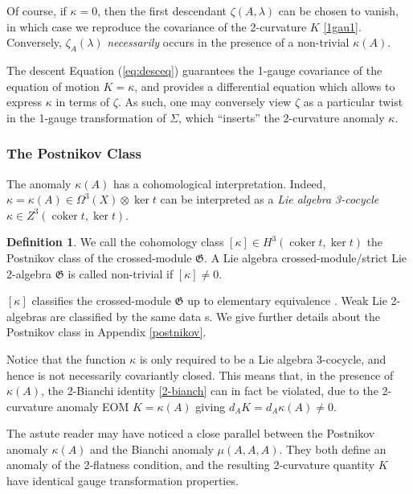 \documentclass[onecolumn]{article}
\theoremstyle{theorem}
\theoremstyle{remark}
\theoremstyle{example}
\theoremstyle{definition}
\newtheorem{definition}{Definition}[section]
\numberwithin{equation}{section}
\begin{document}
{Of course, } %
if $\kappa=0$, then the first descendant $\zeta(A,\lambda)$ can be chosen to vanish, in which case we reproduce the covariance of the 2-curvature $K$ \eqref{1gau1}. Conversely, $\zeta_A(\lambda)$ \textit{{necessarily}} occurs in the presence of a non-trivial $\kappa(A)$. 

The {descent Equation}  (\ref{eq:desceq}) guarantees the 1-gauge covariance of the equation of motion $K=\kappa$, and provides a differential equation which allows to express $\kappa$ in terms of $\zeta$. As such, one may conversely view $\zeta$ as a particular twist in the 1-gauge transformation of $\Sigma$, which ``inserts'' the 2-curvature anomaly $\kappa$. 

\subsubsection{The Postnikov Class}
The anomaly $\kappa(A)$ has a cohomological interpretation. Indeed, $\kappa=\kappa(A)\in \Omega^3(X)\otimes\operatorname{ker}t$ can be interpreted as a  {\it {Lie algebra 3-cocycle}} $\kappa\in Z^3(\operatorname{coker}t,\operatorname{ker}t)$.

\begin{definition}
We call the cohomology class $[\kappa]\in H^3(\operatorname{coker}t,\operatorname{ker}t)$ the { {Postnikov class}} of the crossed-module $\mathfrak{G}$. A Lie algebra crossed-module/strict Lie 2-algebra $\mathfrak{G}$ is called { {non-trivial}} if $[\kappa]\neq 0$.
\end{definition}

{$[\kappa]$ classifies} %
 the crossed-module $\mathfrak{G}$ up to elementary equivalence \cite{Wag:2006,Baez:2003fs}. Weak Lie 2-algebras are classified by the same data  \cite{Roytenberg:2007}s. We give further details about the Postnikov class in Appendix \ref{postnikov}.

Notice that the function $\kappa$ is only required to be a Lie algebra 3-cocycle, and hence is not necessarily covariantly closed. This means that, in the presence of $\kappa(A)$, the 2-Bianchi identity \eqref{2-bianch} can in fact be violated, due to the 2-curvature anomaly EOM $K=\kappa(A)$ giving $d_AK = d_A\kappa(A) \neq 0$. 


The astute reader may have noticed a close parallel between the Postnikov anomaly $\kappa(A)$ and the Bianchi anomaly $\mu(A,A,A)$. They both define an anomaly of the 2-flatness condition, and the resulting 2-curvature quantity $K$ have identical gauge transformation properties. 
\end{document}
